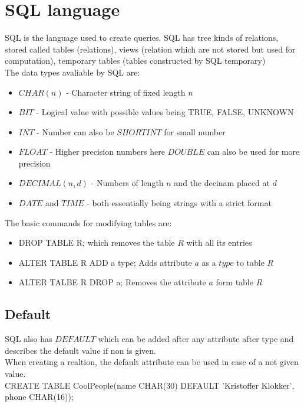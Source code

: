 \documentclass[12pt, a4paper]{article}
\begin{document}
	\section{SQL language}
		SQL is the language used to create queries. SQL has tree kinds of relations, stored called tables (relations), views (relation which are not stored but used for computation), temporary tables (tables constructed by SQL temporary)\\
		The data types avaliable by SQL are:
		\begin{itemize}
			\item $CHAR(n)$ - Character string of fixed length $n$
			\item $BIT$ - Logical value with possible values being TRUE, FALSE, UNKNOWN
			\item $INT$ - Number can also be $SHORTINT$ for small number
			\item $FLOAT$ - Higher precision numbers here $DOUBLE$ can also be used for more precision
			\item $DECIMAL(n,d)$ - Numbers of length $n$ and the decinam placed at $d$
			\item $DATE$ and $TIME$ - both essentially being strings with a strict format
		\end{itemize}
		The basic commands for modifying tables are:
		\begin{itemize}
			\item DROP TABLE R; which removes the table $R$ with all its entries
			\item ALTER TABLE R ADD a type; Adds attribute $a$ as a $type$ to table $R$
			\item ALTER TALBE R DROP a; Removes the attribute $a$ form table $R$
		\end{itemize}
		\subsection{Default}
			SQL also has $DEFAULT$ which can be added after any attribute after type and describes the default value if non is given.\\
			When creating a realtion, the default attribute can be used in case of a not given value.\\
			CREATE TABLE CoolPeople(name CHAR(30) DEFAULT 'Kristoffer Klokker', phone CHAR(16));
			
\end{document}
